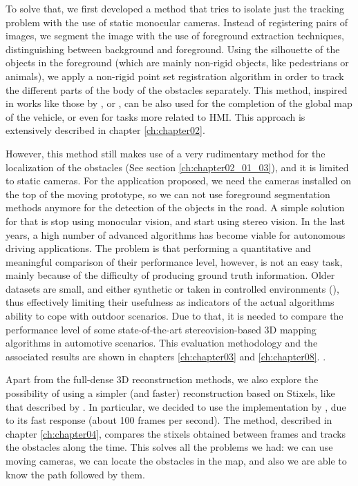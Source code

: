 To solve that, we first developed a method that tries to isolate just the tracking problem with the use of static monocular cameras. Instead of registering pairs of images, we segment the image with the use of foreground extraction techniques, distinguishing between background and foreground. Using the silhouette of the objects in the foreground (which are mainly non-rigid objects, like pedestrians or animals), we apply a non-rigid point set registration algorithm in order to track the different parts of the body of the obstacles separately. This method, inspired in works like those by \cite{starck2007surface}, or \cite{letouzey2011scene}, can be also used for the completion of the global map of the vehicle, or even for tasks more related to \ac{HMI}. This approach is extensively described in chapter \ref{ch:chapter02}.

However, this method still makes use of a very rudimentary method for the localization of the obstacles (See section \ref{ch:chapter02_01_03}), and it is limited to static cameras. For the application proposed, we need the cameras installed on the top of the moving prototype, so we can not use foreground segmentation methods anymore for the detection of the objects in the road. A simple solution for that is stop using monocular vision, and start using stereo vision. In the last years, a high number of advanced algorithms has become viable for autonomous driving applications. The problem is that performing a quantitative and meaningful comparison of their performance level, however, is not an easy task, mainly because of the difficulty of producing ground truth information. Older datasets are small, and either synthetic or taken in controlled environments (\cite{Scharstein2002}), thus effectively limiting their usefulness as indicators of the actual algorithms ability to cope with outdoor scenarios. Due to that, it is needed to compare the performance level of some state-of-the-art stereovision-based 3D mapping algorithms in automotive scenarios. This evaluation methodology and the associated results are shown in chapters \ref{ch:chapter03} and \ref{ch:chapter08}. .

Apart from the full-dense 3D reconstruction methods, we also explore the possibility of using a simpler (and faster) reconstruction based on Stixels, like that described by \cite{badino2009stixel}. In particular, we decided to use the implementation by \cite{benenson2012pedestrian}, due to its fast response (about 100 frames per second). The method, described in chapter \ref{ch:chapter04}, compares the stixels obtained between frames and tracks the obstacles along the time. This solves all the problems we had: we can use moving cameras, we can locate the obstacles in the map, and also we are able to know the path followed by them.

